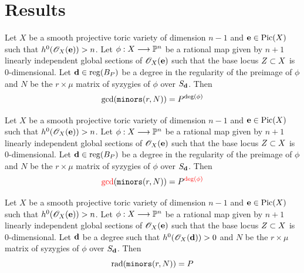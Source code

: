 \documentclass[]{beamer}
\begin{document}
\section{Results}

\begin{frame}
\begin{theorem}
	Let $X$ be a smooth projective toric variety of dimension $n-1$
	and $\mathbf e\in\operatorname{Pic}(X)$ such that $h^0(\mathscr{O}_X(\mathbf e))>n$.
	Let $\phi:X\longrightarrow\mathbb{P}^n$ be a rational map given by $n+1$ linearly independent
	global sections of $\mathscr{O}_X(\mathbf e)$ such that the base locus $Z\subset X$ is 0-dimensional.
	Let $\mathbf d\in\operatorname{reg}(B_P)$ be a degree in the regularity of the preimage of $\phi$
	and $N$ be the $r\times\mu$ matrix of syzygies of $\phi$ over $S_\mathbf d$. Then
	\[
		\gcd(\mathop{\tt minors}(r,N))=P^{\deg(\phi)}
	\]
\end{theorem}
\end{frame}

\begin{frame}
\begin{theorem}
	Let $X$ be a smooth projective toric variety of dimension $n-1$
	and $\mathbf e\in\operatorname{Pic}(X)$ such that $h^0(\mathscr{O}_X(\mathbf e))>n$.
	Let $\phi:X\longrightarrow\mathbb{P}^n$ be a rational map given by $n+1$ linearly independent
	global sections of $\mathscr{O}_X(\mathbf e)$ such that the base locus $Z\subset X$ is 0-dimensional.
	Let {\color{red}$\mathbf d\in\operatorname{reg}(B_P)$ be a degree in the regularity of the preimage of $\phi$}
	and $N$ be the $r\times\mu$ matrix of syzygies of $\phi$ over $S_\mathbf d$. Then
	\[
		{\color{red}\gcd}(\mathop{\tt minors}(r,N))=P^{\color{red}\deg(\phi)}
	\]
\end{theorem}
\end{frame}

\begin{frame}
\begin{theorem}
	Let $X$ be a smooth projective toric variety of dimension $n-1$
	and $\mathbf e\in\operatorname{Pic}(X)$ such that $h^0(\mathscr{O}_X(\mathbf e))>n$.
	Let $\phi:X\longrightarrow\mathbb{P}^n$ be a rational map given by $n+1$ linearly independent
	global sections of $\mathscr{O}_X(\mathbf e)$ such that the base locus $Z\subset X$ is 0-dimensional.
	Let $\mathbf d$ be a degree such that $h^0(\mathscr{O}_X(\mathbf d))>0$
	and $N$ be the $r\times\mu$ matrix of syzygies of $\phi$ over $S_\mathbf d$. Then
	\[
		\operatorname{rad}(\mathop{\tt minors}(r,N))=P
	\]
\end{theorem}
\end{frame}
\end{document}
